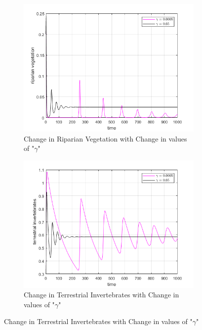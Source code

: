 \documentclass[12pt]{article}
\numberwithin{equation}{section}
\begin{document}
\FloatBarrier
\begin{figure}[bp!]
	\centering
	\begin{subfigure}[t]{0.45\textwidth}
		\centering
	\includegraphics[width=\textwidth]{time_vs_riparian_gamma.png}
		\caption{Change in Riparian Vegetation with Change in values of "$\gamma$"} \label{fig:time_vs_riparian_gamma}
	\end{subfigure}
\hspace{0.08\textwidth}
        \begin{subfigure}[t]{0.45\textwidth}
                 \centering
         \includegraphics[width=\textwidth]{time_vs_invertebrates_gamma.png}
		\caption{Change in Terrestrial Invertebrates with Change in values of "$\gamma$"} \label{fig:time_vs_invertebrates_gamma}

\end{subfigure}
\end{figure}
\end{document}
